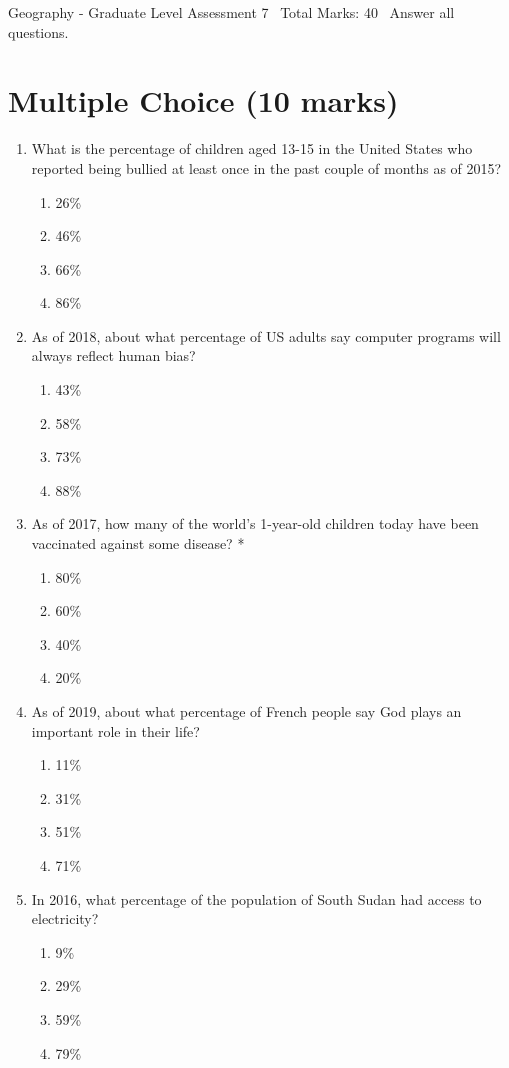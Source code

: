 \documentclass[12pt]{article}
\begin{document}
\begin{center}
Geography - Graduate Level Assessment 7 \
Total Marks: 40 \
Answer all questions.
\end{center}

\section*{Multiple Choice (10 marks)}
\begin{enumerate}[label=\arabic*.]
\item What is the percentage of children aged 13-15 in the United States who reported being bullied at least once in the past couple of months as of 2015?
\begin{enumerate}[label=(\alph*)]
    \item 26\%
    \item 46\%
    \item 66\%
    \item 86\%
\end{enumerate}
\item As of 2018, about what percentage of US adults say computer programs will always reflect human bias?
\begin{enumerate}[label=(\alph*)]
    \item 43\%
    \item 58\%
    \item 73\%
    \item 88\%
\end{enumerate}
\item As of 2017, how many of the world's 1-year-old children today have been vaccinated against some disease? *
\begin{enumerate}[label=(\alph*)]
    \item 80\%
    \item 60\%
    \item 40\%
    \item 20\%
\end{enumerate}
\item As of 2019, about what percentage of French people say God plays an important role in their life?
\begin{enumerate}[label=(\alph*)]
    \item 11\%
    \item 31\%
    \item 51\%
    \item 71\%
\end{enumerate}
\item In 2016, what percentage of the population of South Sudan had access to electricity?
\begin{enumerate}[label=(\alph*)]
    \item 9\%
    \item 29\%
    \item 59\%
    \item 79\%
\end{enumerate}
\end{enumerate}
\end{document}
